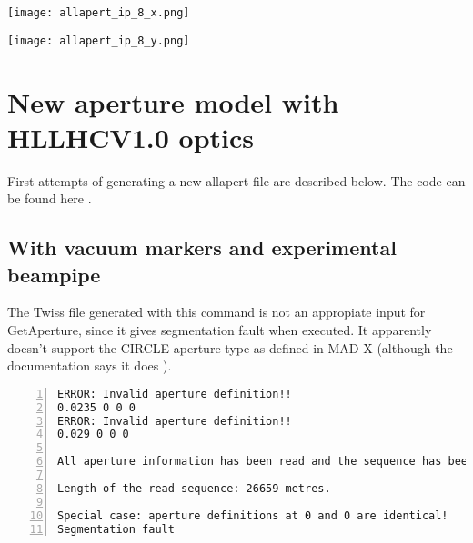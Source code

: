 \documentclass[11pt]{article}
\begin{document}
\begin{minipage}{0.47\linewidth}
\texttt{[image: allapert\_ip\_8\_x.png]}
\end{minipage}
\begin{minipage}{0.47\linewidth}
\texttt{[image: allapert\_ip\_8\_y.png]}
\end{minipage}

\section{New aperture model with HLLHCV1.0 optics}
First attempts of generating a new allapert file are described below. The code can be found here \cite{github}.
\subsection{With vacuum markers and experimental beampipe}


\vspace{50pt}

The Twiss file generated with this command is not an appropiate input for GetAperture, since it gives segmentation fault when executed. It apparently doesn't support the CIRCLE aperture type as defined in MAD-X \cite{mad_ap} (although the documentation says it does \cite{website}).

\begin{lstlisting}[frame=single, basicstyle=\ttfamily\footnotesize, numbers=left] 
ERROR: Invalid aperture definition!!
0.0235 0 0 0 
ERROR: Invalid aperture definition!!
0.029 0 0 0 

All aperture information has been read and the sequence has been created!

Length of the read sequence: 26659 metres.

Special case: aperture definitions at 0 and 0 are identical!
Segmentation fault
\end{lstlisting}
\vspace{20pt}
\end{document}
